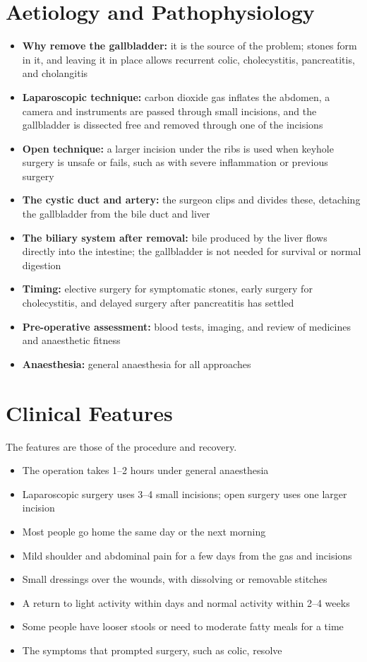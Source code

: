 \section*{Aetiology and Pathophysiology}
\begin{itemize}
    \item \textbf{Why remove the gallbladder:} it is the source of the problem; stones form in it, and leaving it in place allows recurrent colic, cholecystitis, pancreatitis, and cholangitis
    \item \textbf{Laparoscopic technique:} carbon dioxide gas inflates the abdomen, a camera and instruments are passed through small incisions, and the gallbladder is dissected free and removed through one of the incisions
    \item \textbf{Open technique:} a larger incision under the ribs is used when keyhole surgery is unsafe or fails, such as with severe inflammation or previous surgery
    \item \textbf{The cystic duct and artery:} the surgeon clips and divides these, detaching the gallbladder from the bile duct and liver
    \item \textbf{The biliary system after removal:} bile produced by the liver flows directly into the intestine; the gallbladder is not needed for survival or normal digestion
    \item \textbf{Timing:} elective surgery for symptomatic stones, early surgery for cholecystitis, and delayed surgery after pancreatitis has settled
    \item \textbf{Pre-operative assessment:} blood tests, imaging, and review of medicines and anaesthetic fitness
    \item \textbf{Anaesthesia:} general anaesthesia for all approaches
\end{itemize}

\section*{Clinical Features}
The features are those of the procedure and recovery.
\begin{itemize}
    \item The operation takes 1--2 hours under general anaesthesia
    \item Laparoscopic surgery uses 3--4 small incisions; open surgery uses one larger incision
    \item Most people go home the same day or the next morning
    \item Mild shoulder and abdominal pain for a few days from the gas and incisions
    \item Small dressings over the wounds, with dissolving or removable stitches
    \item A return to light activity within days and normal activity within 2--4 weeks
    \item Some people have looser stools or need to moderate fatty meals for a time
    \item The symptoms that prompted surgery, such as colic, resolve
\end{itemize}

